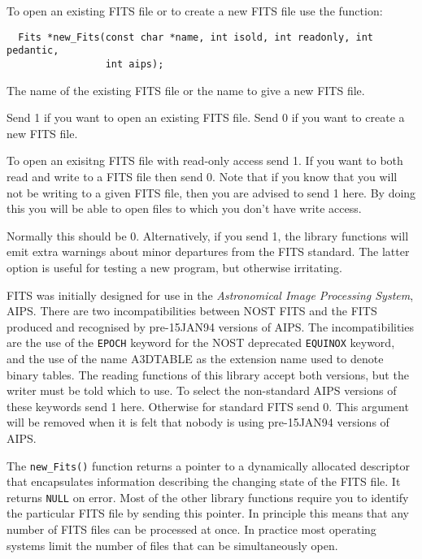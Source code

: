 To open an existing FITS file or to create a new FITS file use the
function:
\label{new_Fits}\begin{verbatim}
  Fits *new_Fits(const char *name, int isold, int readonly, int pedantic,
                 int aips);
\end{verbatim}
\begin{arglist}

  The name of the existing FITS file or the name to
              give a new FITS file.

  Send 1 if you want to open an existing FITS file.
               Send 0 if you want to create a new FITS file.

  To open an exisitng FITS file with read-only access
             send 1. If you want to both read and write to a FITS file
             then send 0. Note that if you know that you will not be
             writing to a given FITS file, then you are advised to send 1
             here. By doing this you will be able to open files to
             which you don't have write access.

  Normally this should be 0. Alternatively, if
             you send 1, the library functions will emit extra
             warnings about minor departures from the FITS standard.
             The latter option is useful for testing a new program,
             but otherwise irritating.

  FITS was initially designed for use in the {\em
             Astronomical Image Processing System}, AIPS. There are
             two incompatibilities between NOST FITS and the FITS
             produced and recognised by pre-15JAN94 versions of
             AIPS. The incompatibilities are the use of the
             \verb`EPOCH` keyword for the NOST deprecated
             \verb`EQUINOX` keyword, and the use of the name A3DTABLE
             as the extension name used to denote binary tables. The
             reading functions of this library accept both versions,
             but the writer must be told which to use. To select the
             non-standard AIPS versions of these keywords send 1 here.
             Otherwise for standard FITS send 0. This argument will be
             removed when it is felt that nobody is using pre-15JAN94
             versions of AIPS.

\end{arglist}

The \verb`new_Fits()` function returns a pointer to a dynamically
allocated descriptor that encapsulates information describing the
changing state of the FITS file. It returns \verb`NULL` on error. Most
of the other library functions require you to identify the particular
FITS file by sending this pointer. In principle this means that any
number of FITS files can be processed at once. In practice most
operating systems limit the number of files that can be simultaneously
open.

